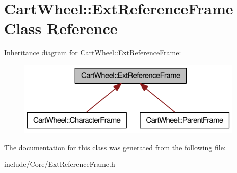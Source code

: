 \hypertarget{classCartWheel_1_1ExtReferenceFrame}{
\section{CartWheel::ExtReferenceFrame Class Reference}
\label{classCartWheel_1_1ExtReferenceFrame}
}


Inheritance diagram for CartWheel::ExtReferenceFrame:\nopagebreak
\begin{figure}[H]
\begin{center}
\leavevmode
\includegraphics[width=306pt]{classCartWheel_1_1ExtReferenceFrame__inherit__graph}
\end{center}
\end{figure}


The documentation for this class was generated from the following file:\begin{DoxyCompactItemize}
\item 
include/Core/ExtReferenceFrame.h\end{DoxyCompactItemize}
